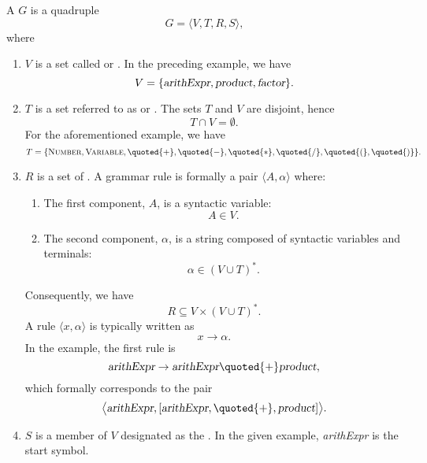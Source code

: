 \begin{Definition}
A   \( G \) is a quadruple 
\[ 
   G = \langle V, T, R, S \rangle,
\]
where
\begin{enumerate}
\item \( V \) is a set called   or . In the preceding example, we have
      \[
      V = \{ \textsl{arithExpr}, \textsl{product}, \textsl{factor} \}.
      \]

\item \( T \) is a set referred to as  or . The sets \( T \) and \( V \) are disjoint, hence
      \[
      T \cap V = \emptyset.
      \]
      For the aforementioned example, we have
      \[
      T = \{ \textsc{Number}, \textsc{Variable}, \quoted{+}, \quoted{-}, \quoted{*}, \quoted{/}, \quoted{(}, \quoted{)} \}.
      \]

\item \( R \) is a set of . A grammar rule is formally a pair \( \langle A, \alpha \rangle \) where:
      \begin{enumerate}
      \item The first component, \( A \), is a syntactic variable:
            \[
            A \in V.
            \]
      \item The second component, \( \alpha \), is a string composed of syntactic variables and terminals:
            \[
            \alpha \in (V \cup T)^*.
            \]
      \end{enumerate}
      Consequently, we have
      \[
      R \subseteq V \times (V \cup T)^*.
      \]
      A rule \( \langle x, \alpha \rangle \) is typically written as
      \[
      x \rightarrow \alpha.
      \]
      In the example, the first rule is
      \[
      \textsl{arithExpr} \rightarrow \textsl{arithExpr} \quoted{+} \textsl{product},
      \]
      which formally corresponds to the pair
      \[
      \bigl\langle \textsl{arithExpr}, [\textsl{arithExpr}, \quoted{+}, \textsl{product}] \bigr\rangle.
      \]

\item \( S \) is a member of \( V \) designated as the . In the given example, \textsl{arithExpr} is the start symbol.
      \eox
\end{enumerate}
\end{Definition}

